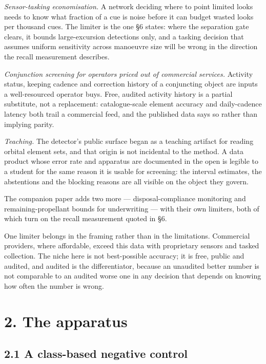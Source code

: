 \documentclass[11pt]{article}
\begin{document}
\emph{Sensor-tasking economisation.} A network deciding where to point limited looks needs to know what fraction of a cue is noise before it can budget wasted looks per thousand cues. The limiter is the one \S{}6 states: where the separation gate clears, it bounds large-excursion detections only, and a tasking decision that assumes uniform sensitivity across manoeuvre size will be wrong in the direction the recall measurement describes.

\emph{Conjunction screening for operators priced out of commercial services.} Activity status, keeping cadence and correction history of a conjuncting object are inputs a well-resourced operator buys. Free, audited activity history is a partial substitute, not a replacement: catalogue-scale element accuracy and daily-cadence latency both trail a commercial feed, and the published data says so rather than implying parity.

\emph{Teaching.} The detector's public surface began as a teaching artifact for reading orbital element sets, and that origin is not incidental to the method. A data product whose error rate and apparatus are documented in the open is legible to a student for the same reason it is usable for screening: the interval estimates, the abstentions and the blocking reasons are all visible on the object they govern.

The companion paper adds two more --- disposal-compliance monitoring and remaining-propellant bounds for underwriting --- with their own limiters, both of which turn on the recall measurement quoted in \S{}6.

One limiter belongs in the framing rather than in the limitations. Commercial providers, where affordable, exceed this data with proprietary sensors and tasked collection. The niche here is not best-possible accuracy; it is free, public and audited, and audited is the differentiator, because an unaudited better number is not comparable to an audited worse one in any decision that depends on knowing how often the number is wrong.

\section*{2. The apparatus}

\subsection*{2.1 A class-based negative control}
\end{document}
